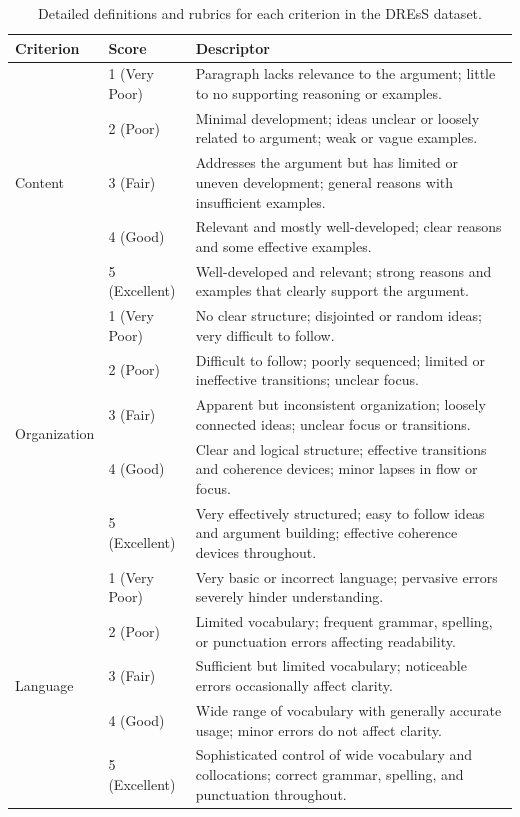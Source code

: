 \documentclass[letterpaper]{article} %
\begin{document}
\begin{table}[h]
\centering
\renewcommand{\arraystretch}{1.4}
\begin{tabular}{|p{3.5cm}|p{2.4cm}|p{8.1cm}|}
\hline
\textbf{Criterion} & \textbf{Score} & \textbf{Descriptor} \\
\hline
\multirow{5}{=}{Content}
& 1 (Very Poor) & Paragraph lacks relevance to the argument; little to no supporting reasoning or examples. \\
& 2 (Poor) & Minimal development; ideas unclear or loosely related to argument; weak or vague examples. \\
& 3 (Fair) & Addresses the argument but has limited or uneven development; general reasons with insufficient examples. \\
& 4 (Good) & Relevant and mostly well-developed; clear reasons and some effective examples. \\
& 5 (Excellent) & Well-developed and relevant; strong reasons and examples that clearly support the argument. \\
\hline
\multirow{5}{=}{Organization}
& 1 (Very Poor) & No clear structure; disjointed or random ideas; very difficult to follow. \\
& 2 (Poor) & Difficult to follow; poorly sequenced; limited or ineffective transitions; unclear focus. \\
& 3 (Fair) & Apparent but inconsistent organization; loosely connected ideas; unclear focus or transitions. \\
& 4 (Good) & Clear and logical structure; effective transitions and coherence devices; minor lapses in flow or focus. \\
& 5 (Excellent) & Very effectively structured; easy to follow ideas and argument building; effective coherence devices throughout. \\
\hline
\multirow{5}{=}{Language}
& 1 (Very Poor) & Very basic or incorrect language; pervasive errors severely hinder understanding. \\
& 2 (Poor) & Limited vocabulary; frequent grammar, spelling, or punctuation errors affecting readability. \\
& 3 (Fair) & Sufficient but limited vocabulary; noticeable errors occasionally affect clarity. \\
& 4 (Good) & Wide range of vocabulary with generally accurate usage; minor errors do not affect clarity. \\
& 5 (Excellent) & Sophisticated control of wide vocabulary and collocations; correct grammar, spelling, and punctuation throughout. \\
\hline
\end{tabular}
\caption{Detailed definitions and rubrics for each criterion in the DREsS dataset.}
\label{apx:dress_rubric}
\end{table}
\end{document}
